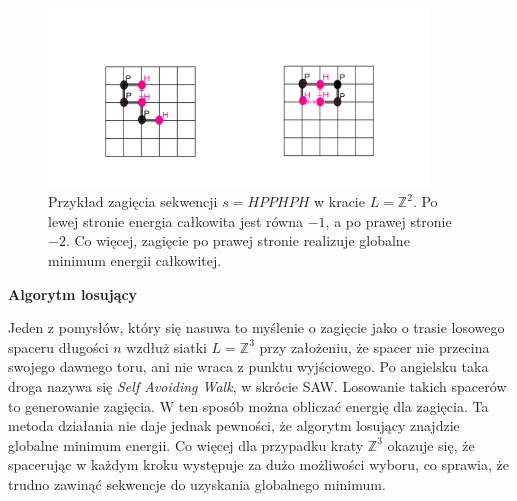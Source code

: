 \documentclass[leqno,10pt]{article}
\begin{document}
\begin{figure}[!htbp]
    \centering
    \includegraphics[width=0.9\textwidth]{diagram.png}
    \caption{Przykład zagięcia sekwencji $s={HPPHPH}$ w kracie $L=\mathbb{Z}^{2}$. Po lewej stronie energia całkowita jest równa $-1$, a po prawej stronie $-2$. Co więcej, zagięcie po prawej stronie realizuje globalne minimum energii całkowitej. }
\end{figure}


\textbf{Algorytm losujący}

Jeden z pomysłów, który się nasuwa to myślenie o zagięcie jako o trasie losowego spaceru długości $n$ wzdłuż siatki $L=\mathbb{Z}^{3}$ przy założeniu, że spacer nie przecina swojego dawnego toru, ani nie wraca z punktu wyjściowego. Po angielsku taka droga nazywa się \textit{Self Avoiding Walk}, w skrócie SAW. Losowanie takich spacerów to generowanie zagięcia. W ten sposób można obliczać energię dla zagięcia. Ta metoda  działania nie daje jednak pewności, że algorytm losujący znajdzie globalne minimum energii. Co więcej dla przypadku kraty $\mathbb{Z}^3$ okazuje się, że spacerując w każdym kroku występuje za dużo możliwości wyboru, co sprawia, że trudno zawinąć sekwencje do uzyskania globalnego minimum. 
\end{document}
